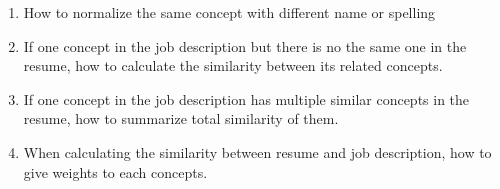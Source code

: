 \begin{enumerate}
    \item How to normalize the same concept with different name or spelling
    \item If one concept in the job description but there is no the same one in the resume, how to calculate the similarity between its related concepts.
    \item If one concept in the job description has multiple similar concepts in the resume, how to summarize total similarity of them.
    \item When calculating the similarity between resume and job description, how to give weights to each concepts.
\end{enumerate}
